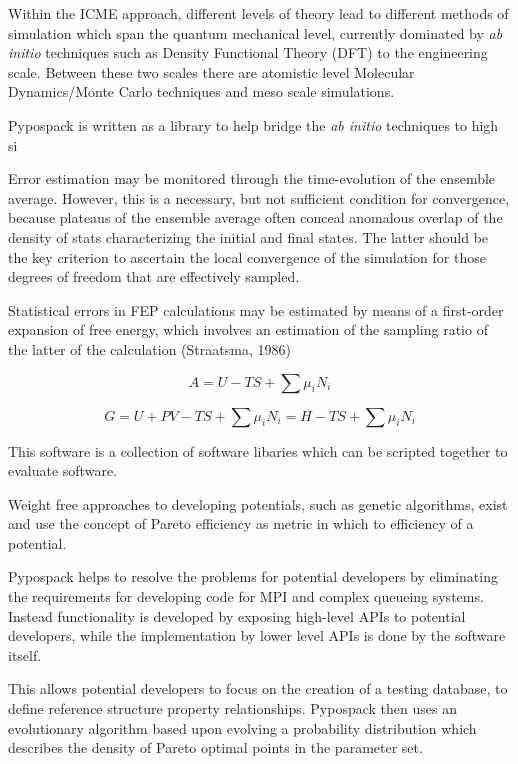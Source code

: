 Within the ICME approach, different levels of theory lead to different methods of simulation which span the quantum mechanical level, currently dominated by \emph{ab initio} techniques such as Density Functional Theory (DFT) to the engineering scale.  Between these two scales there are atomistic level Molecular Dynamics/Monte Carlo techniques and meso scale simulations.

Pypospack is written as a library to help bridge the \emph{ab initio} techniques to high si



Error estimation may be monitored through the time-evolution of the ensemble average.  However, this is a necessary, but not sufficient condition for convergence, because plateaus of the ensemble average often conceal anomalous overlap of the density of stats characterizing the initial and final states.  The latter should be the key criterion to ascertain the local convergence of the simulation for those degrees of freedom that are effectively sampled.

Statistical errors in FEP calculations may be estimated by means of a first-order expansion of free energy, which involves an estimation of the sampling ratio of the latter of the calculation (Straatsma, 1986)

\begin{equation}\label{eq:helmoholtz_free_energy}
  A = U-TS + \sum \mu_i N_i
\end{equation}

\begin{equation}\label{eq:gibbs_free_energy}
  G = U+PV-TS + \sum \mu_i N_i = H - TS + \sum \mu_i N_i
\end{equation}

This software is a collection of software libaries which can be scripted together to evaluate software.

Weight free approaches to developing potentials, such as genetic algorithms, exist and use the concept of Pareto efficiency as metric in which to efficiency of a potential.

Pypospack helps to resolve the problems for potential developers by eliminating the requirements for developing code for MPI and complex queueing systems.  Instead functionality is developed by exposing high-level APIs to potential developers, while the implementation by lower level APIs is done by the software itself.

This allows potential developers to focus on the creation of a testing database, to define reference structure property relationships.  Pypospack then uses an evolutionary algorithm based upon evolving a probability distribution which describes the density of Pareto optimal points in the parameter set.

